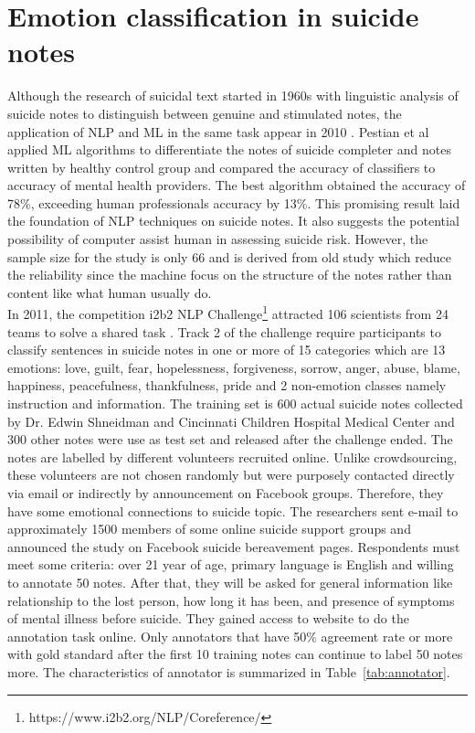 \section{Emotion classification in suicide notes}
Although the research of suicidal text started in 1960s with linguistic analysis of suicide notes to distinguish between genuine and stimulated notes, the application of NLP and ML in the same task appear in 2010 \cite{Desmet2013}. Pestian et al \cite{Pestian2010} applied ML algorithms to differentiate the notes of suicide completer and notes written by healthy control group and compared the accuracy of classifiers to accuracy of mental health providers. The best algorithm obtained the accuracy of 78\%, exceeding human professionals accuracy by 13\%. This promising result laid the foundation of NLP techniques on suicide notes. It also suggests the potential possibility of computer assist human in assessing suicide risk. However, the sample size for the study is only 66 and is derived from old study which reduce the reliability since the machine focus on the structure of the notes rather than content like what human usually do.\\
In 2011, the competition i2b2 NLP Challenge\footnote{https://www.i2b2.org/NLP/Coreference/} attracted 106 scientists from 24 teams to solve a shared task \cite{Pestian2012}. Track 2 of the challenge require participants to classify sentences in suicide notes in one or more of 15 categories which are 13 emotions: love, guilt, fear, hopelessness, forgiveness, sorrow, anger, abuse, blame, happiness, peacefulness, thankfulness, pride  and 2 non-emotion classes namely instruction and information. The training set is 600 actual suicide notes collected by Dr. Edwin Shneidman and Cincinnati Children Hospital Medical Center and 300 other notes were use as test set and released after the challenge ended. The notes are labelled by different volunteers recruited online. Unlike crowdsourcing, these volunteers are not chosen randomly but were purposely contacted directly via email or indirectly by announcement on Facebook groups. Therefore, they have some emotional connections to suicide topic. The researchers sent e-mail to approximately 1500 members of some online suicide support groups and announced the study on Facebook suicide bereavement pages. Respondents must meet some criteria: over 21 year of age, primary language is English and willing to annotate 50 notes. After that, they will be asked for general information like relationship to the lost person, how long it has been, and presence of symptoms of mental illness before suicide. They gained access to website to do the annotation task online. Only annotators that have 50\% agreement rate or more with gold standard after the first 10 training notes can continue to label 50 notes more. The characteristics of annotator is summarized in Table~\ref{tab:annotator}.
